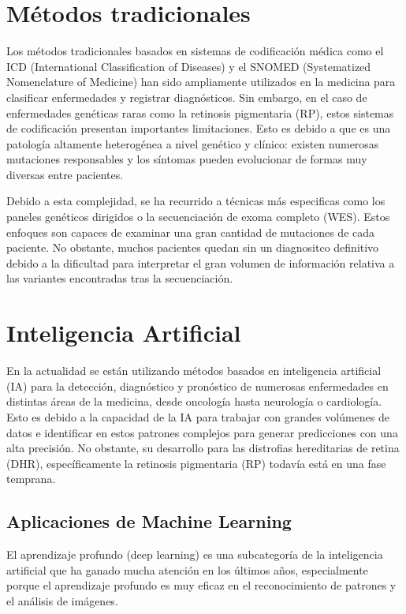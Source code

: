 \documentclass[11pt,spanish,listoffigures,listoftables]{tfgetsinf}
\begin{document}
\section{Métodos tradicionales}

Los métodos tradicionales basados en sistemas de codificación médica como el ICD (International Classification of Diseases) y el SNOMED (Systematized Nomenclature of Medicine) han sido ampliamente utilizados en la medicina para clasificar enfermedades y registrar diagnósticos. Sin embargo, en el caso de enfermedades genéticas raras como la retinosis pigmentaria (\ac{RP}), estos sistemas de codificación presentan importantes limitaciones\cite{VER}. Esto es debido a que es una patología altamente heterogénea a nivel genético y clínico: existen numerosas mutaciones responsables y los síntomas pueden evolucionar de formas muy diversas entre pacientes\cite{HAR}. 

Debido a esta complejidad, se ha recurrido a técnicas más especificas como los paneles genéticos dirigidos o la secuenciación de exoma completo (\ac{WES}). Estos enfoques son capaces de examinar una gran cantidad de mutaciones de cada paciente. No obstante, muchos pacientes quedan sin un diagnositco definitivo debido a la dificultad para interpretar el gran volumen de información relativa a las variantes encontradas tras la secuenciación.

\section{Inteligencia Artificial}

En la actualidad se están utilizando métodos basados en inteligencia artificial (\ac{IA}) para la detección, diagnóstico y pronóstico de numerosas enfermedades en distintas áreas de la medicina, desde oncología hasta neurología o cardiología. Esto es debido a la capacidad de la \ac{IA} para trabajar con grandes volúmenes de datos e identificar en estos patrones complejos para generar predicciones con una alta precisión\cite{FER}. No obstante, su desarrollo para las distrofias hereditarias de retina (\ac{DHR}), específicamente la retinosis pigmentaria (\ac{RP}) todavía está en una fase temprana.

\subsection{Aplicaciones de Machine Learning}

El aprendizaje profundo (deep learning) es una subcategoría de la inteligencia artificial que ha ganado mucha atención en los últimos años, especialmente porque el aprendizaje profundo es muy eficaz en el reconocimiento de patrones y el análisis de imágenes\cite{STE}.
\end{document}
